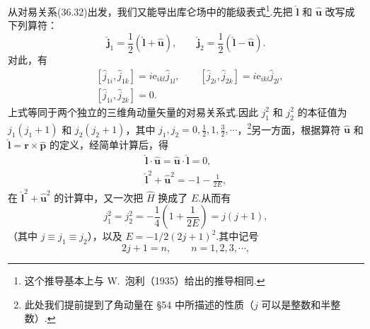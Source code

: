 从对易关系(36.32)出发，我们又能导出库仑场中的能级表式\footnote{这个推导基本上与 W.~泡利（1935）给出的推导相同.}.先把 $\hat{\boldsymbol{l}}$ 和 $\hat{\boldsymbol{u}}$ 改写成下列算符：
\begin{equation}
  \hat{\boldsymbol{j}}_1=\frac{1}{2}\left(\hat{\boldsymbol{l}}+\hat{\boldsymbol{u}}\right),
  \qquad
  \hat{\boldsymbol{j}}_2=\frac{1}{2}\left(\hat{\boldsymbol{l}}-\hat{\boldsymbol{u}}\right).
\end{equation}
对此，有
\begin{equation}
\begin{aligned}
  &[\hat{j}_{1i},\hat{j}_{1k}]=i\mathrm{e}_{ikl}\hat{j}_{1l},\qquad
  [\hat{j}_{2i},\hat{j}_{2k}]=i\mathrm{e}_{ikl}\hat{j}_{2l},\\
  &[\hat{j}_{1i},\hat{j}_{2k}]=0.
\end{aligned}
\end{equation}
上式等同于两个独立的三维角动量矢量的对易关系式.因此 $j_1^2$ 和 $j_2^2$ 的本征值为 $j_1(j_1+1)$ 和 $j_2(j_2+1)$，其中 $j_1,j_2=0,\frac{1}{2},1,\frac{3}{2},\cdots$，\footnote{此处我们提前提到了角动量在 §54 中所描述的性质（$j$ 可以是整数和半整数）.}另一方面，根据算符 $\hat{\boldsymbol{u}}$ 和 $\hat{\boldsymbol{l}}=\boldsymbol{r}\times\hat{\boldsymbol{p}}$ 的定义，经简单计算后，得
\begin{gather*}
  \hat{\boldsymbol{l}}\cdot\hat{\boldsymbol{u}}
  =\hat{\boldsymbol{u}}\cdot\hat{\boldsymbol{l}}=0,\\
  \hat{\boldsymbol{l}}^2+\hat{\boldsymbol{u}}^2=-1-\frac{1}{2E},
\end{gather*}
在 $\hat{\boldsymbol{l}}^2+\hat{\boldsymbol{u}}^2$ 的计算中，又一次把 $\hat{H}$ 换成了 $E$.从而有
\begin{equation*}
  j_1^2=j_2^2=-\frac{1}{4}\left(1+\frac{1}{2E}\right)=j(j+1),
\end{equation*}
（其中 $j\equiv j_1\equiv j_2$），以及 $E=-1/2(2j+1)^2$.其中记号
\begin{equation}
  2j+1=n,\qquad n=1,2,3,\cdots,
\end{equation}
